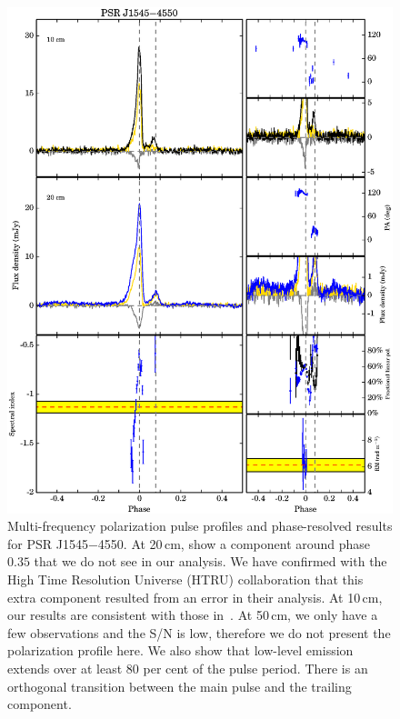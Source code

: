 \documentclass[useAMS,usenatbib]{mn2e}
\begin{document}
\begin{appendix}
\begin{figure}
\begin{center}
\includegraphics[width=6 in]{1545.ps}
\caption{Multi-frequency polarization pulse profiles and phase-resolved results for PSR J1545$-$4550. 
At 20\,cm, \citet{Burgay13} show a component around phase $0.35$ that 
we do not see in our analysis. We have confirmed with the High Time Resolution 
Universe (HTRU) collaboration that this extra component resulted from an error 
in their analysis.  
%
At 10\,cm, our results are consistent with those in~\citet{Burgay13}.
%
At 50\,cm, we only have a few observations and the S/N is low, therefore 
we do not present the polarization profile here.
%
We also show that low-level emission extends over at least $80$ 
per cent of the pulse period.
%
There is an orthogonal transition between the main pulse and 
the trailing component.
}
\label{1545}
\end{center}
\end{figure}


\end{appendix}
\end{document}
